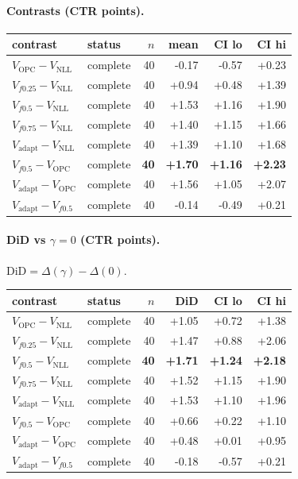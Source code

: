 \documentclass[10pt,a4paper]{article}
\begin{document}
\paragraph{Contrasts (CTR points).}
{\centering\small\begin{tabular}{llrrrr}
\toprule contrast & status & $n$ & mean & CI lo & CI hi \\
\midrule
$V_{\mathrm{OPC}}-V_{\mathrm{NLL}}$ & complete & 40 & -0.17 & -0.57 & +0.23 \\
$V_{f0.25}-V_{\mathrm{NLL}}$ & complete & 40 & +0.94 & +0.48 & +1.39 \\
$V_{f0.5}-V_{\mathrm{NLL}}$ & complete & 40 & +1.53 & +1.16 & +1.90 \\
$V_{f0.75}-V_{\mathrm{NLL}}$ & complete & 40 & +1.40 & +1.15 & +1.66 \\
$V_{\mathrm{adapt}}-V_{\mathrm{NLL}}$ & complete & 40 & +1.39 & +1.10 & +1.68 \\
\textbf{$V_{f0.5}-V_{\mathrm{OPC}}$} & complete & \textbf{40} & \textbf{+1.70} & \textbf{+1.16} & \textbf{+2.23} \\
$V_{\mathrm{adapt}}-V_{\mathrm{OPC}}$ & complete & 40 & +1.56 & +1.05 & +2.07 \\
$V_{\mathrm{adapt}}-V_{f0.5}$ & complete & 40 & -0.14 & -0.49 & +0.21 \\
\bottomrule\end{tabular}\par}
\paragraph{DiD vs $\gamma=0$ (CTR points).} $\mathrm{DiD}=\Delta(\gamma)-\Delta(0)$.
{\centering\small\begin{tabular}{llrrrr}
\toprule contrast & status & $n$ & DiD & CI lo & CI hi \\
\midrule
$V_{\mathrm{OPC}}-V_{\mathrm{NLL}}$ & complete & 40 & +1.05 & +0.72 & +1.38 \\
$V_{f0.25}-V_{\mathrm{NLL}}$ & complete & 40 & +1.47 & +0.88 & +2.06 \\
\textbf{$V_{f0.5}-V_{\mathrm{NLL}}$} & complete & \textbf{40} & \textbf{+1.71} & \textbf{+1.24} & \textbf{+2.18} \\
$V_{f0.75}-V_{\mathrm{NLL}}$ & complete & 40 & +1.52 & +1.15 & +1.90 \\
$V_{\mathrm{adapt}}-V_{\mathrm{NLL}}$ & complete & 40 & +1.53 & +1.10 & +1.96 \\
$V_{f0.5}-V_{\mathrm{OPC}}$ & complete & 40 & +0.66 & +0.22 & +1.10 \\
$V_{\mathrm{adapt}}-V_{\mathrm{OPC}}$ & complete & 40 & +0.48 & +0.01 & +0.95 \\
$V_{\mathrm{adapt}}-V_{f0.5}$ & complete & 40 & -0.18 & -0.57 & +0.21 \\
\bottomrule\end{tabular}\par}
\bigskip
\end{document}
